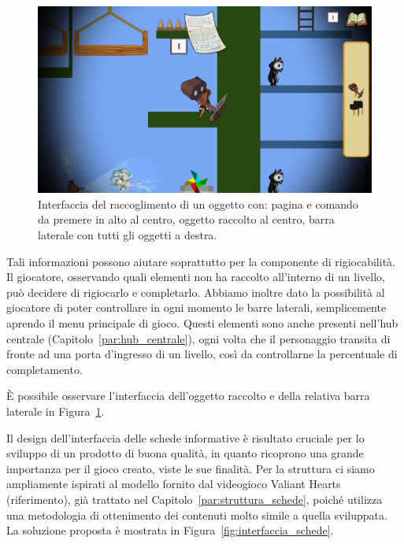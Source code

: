 \begin{figure}%
	\centering
	\includegraphics[width= 0.9\columnwidth]{images/gameDesign/57_interfaccia.jpg}
	\caption{Interfaccia del raccoglimento di un oggetto con: pagina e comando da premere in alto al centro, oggetto raccolto al centro, barra laterale con tutti gli oggetti a destra.}
	\label{fig:interfaccia_oggetti}
\end{figure}

Tali informazioni possono aiutare soprattutto per la componente di rigiocabilità. Il giocatore, osservando quali elementi non ha raccolto all’interno di un livello, può decidere di rigiocarlo e completarlo.
Abbiamo inoltre dato la possibilità al giocatore di poter controllare in ogni momento le barre laterali, semplicemente aprendo il menu principale di gioco.
Questi elementi sono anche presenti nell’hub centrale (Capitolo~\ref{par:hub_centrale}), ogni volta che il personaggio transita di fronte ad una porta d’ingresso di un livello, così da controllarne la percentuale di completamento.

È possibile osservare l'interfaccia dell'oggetto raccolto e della relativa barra laterale in Figura~\ref{fig:interfaccia_oggetti}.

Il design dell’interfaccia delle schede informative è risultato cruciale per lo sviluppo di un prodotto di buona qualità, in quanto ricoprono una grande importanza per il gioco creato, viste le sue finalità.
Per la struttura ci siamo ampliamente ispirati al modello fornito dal videogioco Valiant Hearts (riferimento), già trattato nel Capitolo~\ref{par:struttura_schede}, poiché utilizza una metodologia di ottenimento dei contenuti molto simile a quella sviluppata.
La soluzione proposta è mostrata in Figura~\ref{fig:interfaccia_schede}.

